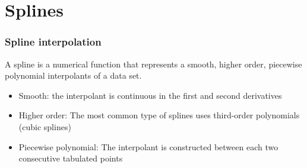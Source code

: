 \documentclass[11pt,table,final,fleqn,xcolor={usenames,dvipsnames,table},handout]{beamer}
\begin{document}
\section{Splines}
\begin{frame}
  \frametitle{Spline interpolation}
  A spline is a numerical function that represents a {\color{tuealert}smooth}, {\color{tuealert}higher order}, {\color{tuealert}piecewise polynomial} interpolants of a data set.
  \pause
  \begin{itemize}
     \item Smooth: the interpolant is continuous in the first and second derivatives 
     \item Higher order: The most common type of splines uses third-order polynomials (cubic splines)
     \item Piecewise polynomial: The interpolant is constructed between each two consecutive tabulated points
  \end{itemize}
\end{frame}
\end{document}

